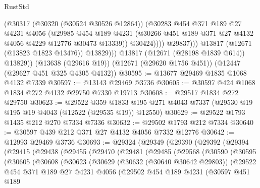 \begin{lexlean}{RustStd}
\begin{coremodule}
                        (@30317
                          (@30320 (@30524 @30526 @12864))
                          (@30283
                            @454
                            @371
                            @189
                            @27
                            @4231
                            @4056
                            (@29985
                              @454
                              @189
                              @4231
                              (@30266 @451 @189 @371 @27 @4132 @4056 @4229 @12776 @30473 @13339))
                            @30424))))
                    @29837)))
              @13817
              (@12671 (@13823 @1823 @13476))
              @13829)))
        @13817
        (@12671 (@28198 @1839 @614))
        @13829))
    (@13638 (@29616 @19))
    (@12671 (@29620 @1756 @451))
    (@12447 (@29627 @451 @325 @4305 @4132))
@30595 := @13677 @29469 @1835 @1068 @4132 @7339
@30597 := @13143 @29469 @3736
@30605 := @30597 @424 @1068 @1834 @272 @4132 @29750 @7330 @19713
@30608 := @29517 @1834 @272 @29750
@30623 := @29522
    @359
    @1833
    @195
    @271
    @4043
    @7337
    (@29530 @19 @195 @19 @4043 (@12522 (@29535 @19)) @12550)
@30629 := @29522 @1793 @1435 @212 @270 @7334 @7336
@30632 := @29502 @1793 @212 @7334
@30640 := @30597 @439 @212 @371 @27 @4132 @4056 @7332 @12776
@30642 := @12993 @29469 @3736
@30693 := @29324
    (@29349
      (@29390
        (@29392
          (@29394
            (@29415
              (@29438
                (@29455
                  (@29470
                    (@29481
                      (@29485
                        (@29568
                          (@30590
                            (@30595
                              (@30605
                                (@30608
                                  (@30623
                                    (@30629
                                      (@30632 (@30640 @30642 @29803))
                                      (@29522
                                        @454
                                        @371
                                        @189
                                        @27
                                        @4231
                                        @4056
                                        (@29502
                                          @454
                                          @189
                                          @4231
                                          (@30597
                                            @451
                                            @189

\end{coremodule}
\end{lexlean}
